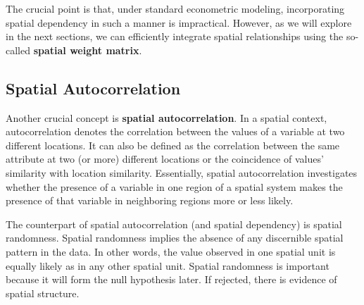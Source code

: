 The crucial point is that, under standard econometric modeling, incorporating spatial dependency in such a manner is impractical. However, as we will explore in the next sections, we can efficiently integrate spatial relationships using the so-called \textbf{spatial weight matrix}. 

\subsection{Spatial Autocorrelation}\label{sec:Spatial_autocorrelation}

Another crucial concept is \textbf{spatial autocorrelation}. In a spatial context, autocorrelation denotes the correlation between the values of a variable at two different locations. It can also be defined as the correlation between the same attribute at two (or more) different locations or the coincidence of values' similarity with location similarity. Essentially, spatial autocorrelation investigates whether the presence of a variable in one region of a spatial system makes the presence of that variable in neighboring regions more or less likely.

The counterpart of spatial autocorrelation (and spatial dependency) is spatial randomness. Spatial randomness implies the absence of any discernible spatial pattern in the data. In other words, the value observed in one spatial unit is equally likely as in any other spatial unit. Spatial randomness is important because it will form the null hypothesis later. If rejected, there is evidence of spatial structure.

